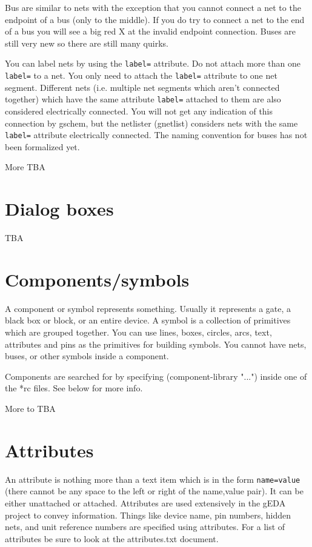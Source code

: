 \documentclass{article}
\begin{document}
Bus are similar to nets with the exception that you cannot connect a
net to the endpoint of a bus (only to the middle).  If you do try to
connect a net to the end of a bus you will see a big red X at the
invalid endpoint connection.  Buses are still very new so there are
still many quirks.

You can label nets by using the {\tt label=} attribute.  Do not attach more
than one {\tt label=} to a net. You only need to attach the {\tt label=} attribute
to one net segment.  Different nets (i.e. multiple net segments which
aren't connected together) which have the same attribute {\tt label=}
attached to them are also considered electrically connected.  You will
not get any indication of this connection by gschem, but the netlister
(gnetlist) considers nets with the same {\tt label=} attribute electrically
connected.  The naming convention for buses has not been formalized
yet.

More TBA

\section{Dialog boxes}
TBA

\section{Components/symbols}
A component or symbol represents something.  Usually it represents a
gate, a black box or block, or an entire device.  A symbol is a
collection of primitives which are grouped together. You can use
lines, boxes, circles, arcs, text, attributes and pins as the
primitives for building symbols.  You cannot have nets, buses, or
other symbols inside a component.

Components are searched for by specifying (component-library "...")
inside one of the *rc files.  See below for more info. 

More to TBA

\section{Attributes}
An attribute is nothing more than a text item which is in the form
{\tt name=value} (there cannot be any space to the left or right of the
name,value pair).  It can be either unattached or attached.
Attributes are used extensively in the gEDA project to convey
information.  Things like device name, pin numbers, hidden nets, and
unit reference numbers are specified using attributes.  For a list of
attributes be sure to look at the attributes.txt document.
\end{document}
